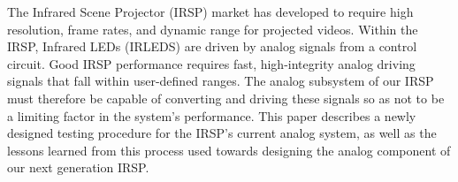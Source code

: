 The Infrared Scene Projector (IRSP) market has developed to require high resolution, frame rates, and dynamic range for projected videos. Within the IRSP, Infrared LEDs (IRLEDS) are driven by analog signals from a control circuit. Good IRSP performance requires fast, high-integrity analog driving signals that fall within user-defined ranges. The analog subsystem of our IRSP must therefore be capable of converting and driving these signals so as not to be a limiting factor in the system's performance. This paper describes a newly designed testing procedure for the IRSP's current analog system, as well as the lessons learned from this process used towards designing the analog component of our next generation IRSP.